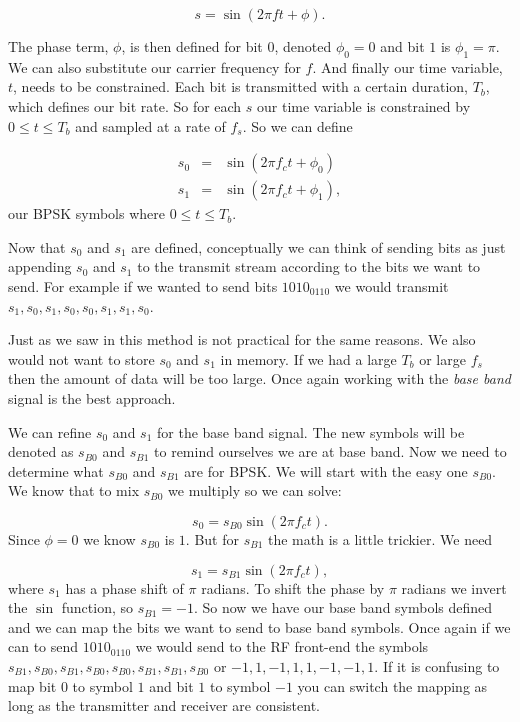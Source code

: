 \begin{equation}
s = \sin\left(2\pi ft + \phi\right).
\end{equation}

The phase term, $\phi$, is then defined for bit $0$, denoted $\phi_0=0$ and bit $1$ is $\phi_1=\pi$. We can also substitute our carrier frequency for $f$. And finally our time variable, $t$, needs to be constrained. Each bit is transmitted with a certain duration, $T_b$, which defines our bit rate. So for each $s$ our time variable is constrained by $0 \leq t \leq T_b$ and sampled at a rate of $f_s$. So we can define

\begin{eqnarray}
s_0 &=& \sin\left(2\pi f_ct + \phi_0\right)\\
s_1 &=& \sin\left(2\pi f_ct + \phi_1\right),
\end{eqnarray}
\noindent
our \ac{BPSK} symbols where $0 \leq t \leq T_b$.

Now that $s_0$ and $s_1$ are defined, conceptually we can think of sending bits as just appending $s_0$ and $s_1$ to the transmit stream according to the bits we want to send. For example if we wanted to send bits $1010_0110$ we would transmit $s_1, s_0, s_1, s_0, s_0, s_1, s_1, s_0$.

Just as we saw in  this method is not practical for the same reasons. We also would not want to store $s_0$ and $s_1$ in memory. If we had a large $T_b$ or large $f_s$ then the amount of data will be too large. Once again working with the \emph{base band} signal is the best approach.

We can refine $s_0$ and $s_1$ for the base band signal. The new symbols will be denoted as $s_{B0}$ and $s_{B1}$ to remind ourselves we are at base band. Now we need to determine what $s_{B0}$ and $s_{B1}$ are for \ac{BPSK}. We will start with the easy one $s_{B0}$. We know that to mix $s_{B0}$ we multiply so we can solve:

\begin{equation}
s_0 = s_{B0}\sin\left(2\pi f_ct\right).
\end{equation}
\noindent
Since $\phi=0$ we know $s_{B0}$ is $1$. But for $s_{B1}$ the math is a little trickier. We need

\begin{equation}
s_1 = s_{B1}\sin\left(2\pi f_ct\right),
\end{equation}
\noindent
where $s_1$ has a phase shift of $\pi$ radians. To shift the phase by $\pi$ radians we invert the $\sin$ function, so $s_{B1}=-1$. So now we have our base band symbols defined and we can map the bits we want to send to base band symbols. Once again if we can to send $1010_0110$ we would send to the \ac{RF} front-end the symbols  $s_{B1}, s_{B0}, s_{B1}, s_{B0}, s_{B0}, s_{B1}, s_{B1}, s_{B0}$ or $-1,1,-1,1,1,-1,-1,1$. If it is confusing to map bit $0$ to symbol $1$ and bit $1$ to symbol $-1$ you can switch the mapping as long as the transmitter and receiver are consistent.
	
